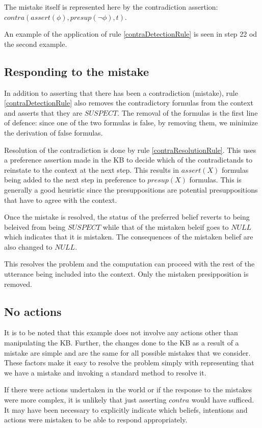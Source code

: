\documentclass{article}
\begin{document}
The mistake itself is represented here by the contradiction assertion:
$contra(assert(\phi), presup(\neg \phi), t)$. 

An example of the application of rule \ref{contraDetectionRule} is
seen in step 22 od the second example.


\subsection{Responding to the mistake}

In addition to asserting that there has been a contradiction
(mistake), rule \ref{contraDetectionRule} also removes the
contradictory formulas from the context and asserts that they are
$SUSPECT$. The removal of the formulas is the first line of defence:
since one of the two formulas is false, by removing them, we minimize
the derivation of false formulas.

Resolution of the contradiction is done by rule
\ref{contraResolutionRule}. This uses a preference assertion made in
the KB to decide which of the contradictands to reinstate to the
context at the next step. This results in $assert(X)$ formulas being
added to the next step in preference to $presup(X)$ formulas. This is
generally a good heuristic since the presuppositions are potential
presuppositions that have to agree with the context.

Once the mistake is resolved, the status of the preferred belief
reverts to being beleived from being $SUSPECT$ while that of the
mistaken beleif goes to $NULL$ which indicates that it is
mistaken. The consequences of the mistaken belief are also changed to
$NULL$. 

This resolves the problem and the computation can proceed with the
rest of the utterance being included into the context. Only the
mistaken presipposition is removed.

\subsection{No actions}

It is to be noted that this example does not involve any actions other
than manipulating the KB. Further, the changes done to the KB as a
result of a mistake are simple and are the same for all possible
mistakes that we consider. These factors make it easy to resolve the
problem simply with representing that we have a mistake and invoking
a standard method to resolve it.

If there were actions undertaken in the world or if the response to
the mistakes were more complex, it is unlikely that just asserting
$contra$ would have sufficed. It may have been necessary to explicitly
indicate which beliefs, intentions and actions were mistaken to be
able to respond appropriately.
\end{document}
